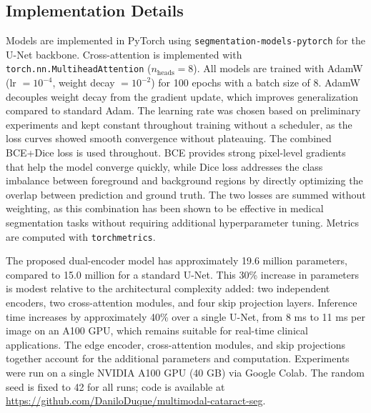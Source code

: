 \subsection{Implementation Details}

Models are implemented in PyTorch using \texttt{segmentation-models-pytorch} for the U-Net backbone. Cross-attention is implemented with \texttt{torch.nn.MultiheadAttention} ($n_\text{heads} = 8$). All models are trained with AdamW (lr $= 10^{-4}$, weight decay $= 10^{-2}$) for 100 epochs with a batch size of 8. AdamW decouples weight decay from the gradient update, which improves generalization compared to standard Adam. The learning rate was chosen based on preliminary experiments and kept constant throughout training without a scheduler, as the loss curves showed smooth convergence without plateauing. The combined BCE+Dice loss is used throughout. BCE provides strong pixel-level gradients that help the model converge quickly, while Dice loss addresses the class imbalance between foreground and background regions by directly optimizing the overlap between prediction and ground truth. The two losses are summed without weighting, as this combination has been shown to be effective in medical segmentation tasks without requiring additional hyperparameter tuning. Metrics are computed with \texttt{torchmetrics}.

The proposed dual-encoder model has approximately 19.6 million parameters, compared to 15.0 million for a standard U-Net. This 30\% increase in parameters is modest relative to the architectural complexity added: two independent encoders, two cross-attention modules, and four skip projection layers. Inference time increases by approximately 40\% over a single U-Net, from 8 ms to 11 ms per image on an A100 GPU, which remains suitable for real-time clinical applications. The edge encoder, cross-attention modules, and skip projections together account for the additional parameters and computation. Experiments were run on a single NVIDIA A100 GPU (40 GB) via Google Colab. The random seed is fixed to 42 for all runs; code is available at \url{https://github.com/DaniloDuque/multimodal-cataract-seg}.
